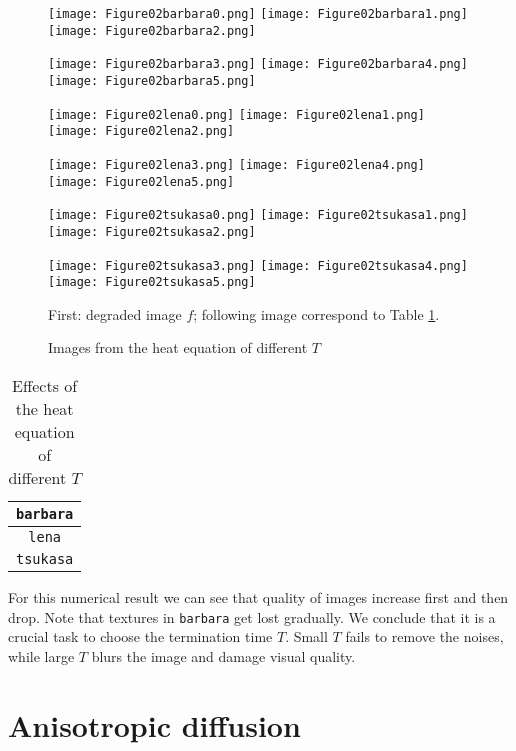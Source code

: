 \documentclass[english, nochinese]{pnote}
\begin{document}
\begin{figure}[htbp]
{
\centering

\texttt{[image: Figure02barbara0.png]}
\texttt{[image: Figure02barbara1.png]}
\texttt{[image: Figure02barbara2.png]}

\texttt{[image: Figure02barbara3.png]}
\texttt{[image: Figure02barbara4.png]}
\texttt{[image: Figure02barbara5.png]}

\texttt{[image: Figure02lena0.png]}
\texttt{[image: Figure02lena1.png]}
\texttt{[image: Figure02lena2.png]}

\texttt{[image: Figure02lena3.png]}
\texttt{[image: Figure02lena4.png]}
\texttt{[image: Figure02lena5.png]}

\texttt{[image: Figure02tsukasa0.png]}
\texttt{[image: Figure02tsukasa1.png]}
\texttt{[image: Figure02tsukasa2.png]}

\texttt{[image: Figure02tsukasa3.png]}
\texttt{[image: Figure02tsukasa4.png]}
\texttt{[image: Figure02tsukasa5.png]}

\caption{Images from the heat equation of different $T$}
\label{Fig:HeatDyn}
}
{
\footnotesize First: degraded image $f$; following image correspond to Table \ref{Tbl:HeatDyn}.
}
\end{figure}

\begin{table}[htbp]
\centering
\begin{tabular}{|c|c|c|c|c|c|c|}
\hline
\multicolumn{7}{|c|}{\texttt{barbara}} \\
\hline

\multicolumn{7}{|c|}{\texttt{lena}} \\
\hline

\multicolumn{7}{|c|}{\texttt{tsukasa}} \\
\hline

\end{tabular}
\caption{Effects of the heat equation of different $T$}
\label{Tbl:HeatDyn}
\end{table}

For this numerical result we can see that quality of images increase first and then drop. Note that textures in \verb"barbara" get lost gradually. We conclude that it is a crucial task to choose the termination time $T$. Small $T$ fails to remove the noises, while large $T$ blurs the image and damage visual quality.

\section{Anisotropic diffusion}
\end{document}
